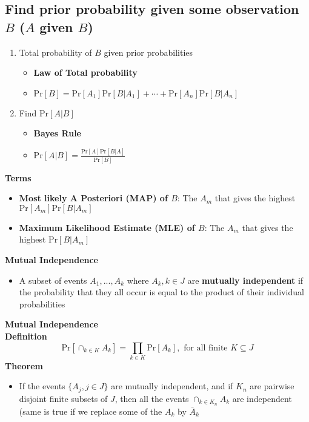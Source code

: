 \documentclass{article}\usepackage{amsmath,amssymb,amsthm,tikz,tkz-graph,color,chngpage,soul,hyperref,csquotes,graphicx,floatrow, listings}\newcommand*{\QEDB}{\hfill\ensuremath{\square}}\newtheorem*{prop}{Proposition}\renewcommand{\theenumi}{\alph{enumi}}\usepackage[shortlabels]{enumitem}\usepackage[nobreak=true]{mdframed}\usetikzlibrary{matrix,calc}\MakeOuterQuote{"}\usepackage[margin=0.75in]{geometry} \newtheorem{theorem}{Theorem}\newcommand{\Z}{\mathbb Z}\newcommand{\R}{\mathbb R}\newcommand{\Q}{\mathbb Q}\newcommand{\N}{\mathbb N}\newcommand{\x}[1]{\textrm{ #1 }}\newcommand{\pr}{\textrm{Pr}}
\begin{document}
\subsection*{Find prior probability given some observation $B$ ($A$ given $B$)}
\begin{enumerate}[1.]
    \item Total probability of $B$ given prior probabilities
    \begin{itemize}
        \item \textbf{Law of Total probability}
        \item $\pr[B] = \pr[A_1]\pr[B|A_1] +\cdots + \pr[A_n]\pr[B|A_n]$
    \end{itemize}
    \item Find $\pr[A|B]$
    \begin{itemize}
        \item \textbf{Bayes Rule}
        \item $\pr[A|B]=\frac{\pr[A]\pr[B|A]}{\pr[B]}$
    \end{itemize}
\end{enumerate}
\begin{mdframed}
\textbf{Terms}
\begin{itemize}
    \item \textbf{Most likely A Posteriori (MAP) of $B$}: The $A_m$ that gives the highest $\pr[A_m]\pr[B|A_m]$
    \item \textbf{Maximum Likelihood Estimate (MLE) of $B$}: The $A_m$ that gives the highest $\pr[B|A_m]$
\end{itemize}
\end{mdframed}
\textbf{Mutual Independence}
\begin{itemize}
\item A subset of events $A_1,..., A_k$ where $A_k, k \in J$ are \textbf{mutually independent} if the probability that they all occur is equal to the product of their individual probabilities
\end{itemize}
\begin{mdframed}
\textbf{Mutual Independence}\\
\textbf{Definition}
\begin{equation}\pr[\cap_{k \in K}A_k]=\prod\limits_{k \in K}\pr[A_k], \x{for all finite} K \subseteq J\end{equation}
\textbf{Theorem}
\begin{itemize}
    \item If the events $\{A_j, j \in J\}$ are mutually independent, and if $K_n$ are pairwise disjoint finite subsets of $J$, then all the events $\cap_{k\in K_n}A_k$ are independent (same is true if we replace some of the $A_k$ by $\bar{A}_k$
\end{itemize}
\end{mdframed}
\end{document}
